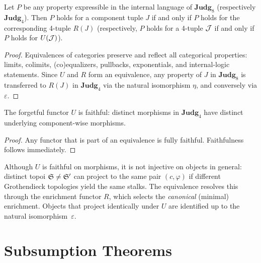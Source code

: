 \begin{corollary}
\label{cor:transfer}
Let $P$ be any property expressible in the internal language of
$\mathbf{Judg}_8$ (respectively $\mathbf{Judg}_4$).  Then $P$ holds
for a component tuple $J$ if and only if $P$ holds for the corresponding
4-tuple $R(J)$ (respectively, $P$ holds for a 4-tuple $\mathcal{J}$ if and
only if $P$ holds for $U(\mathcal{J})$).
\end{corollary}

\begin{proof}
Equivalences of categories preserve and reflect all categorical
properties: limits, colimits, (co)equalizers, pullbacks, exponentials,
and internal-logic statements.  Since $U$ and $R$ form an equivalence,
any property of $J$ in $\mathbf{Judg}_8$ is transferred to $R(J)$ in
$\mathbf{Judg}_4$ via the natural isomorphism $\eta$, and conversely
via $\varepsilon$.
\end{proof}

\begin{corollary}[Faithfulness of $U$]
\label{cor:faithful}
The forgetful functor $U$ is faithful: distinct morphisms in
$\mathbf{Judg}_4$ have distinct underlying component-wise morphisms.
\end{corollary}

\begin{proof}
Any functor that is part of an equivalence is fully faithful.
Faithfulness follows immediately.
\end{proof}

\begin{remark}
\label{rem:non-inj}
Although $U$ is faithful on morphisms, it is not injective on objects
in general: distinct topoi $\mathfrak{S} \neq \mathfrak{S}'$ can project to the
same pair $(c, \varphi)$ if different Grothendieck topologies yield
the same stalks.  The equivalence resolves this through the enrichment
functor $R$, which selects the \emph{canonical} (minimal) enrichment.
Objects that project identically under $U$ are identified up to the
natural isomorphism~$\varepsilon$.
\end{remark}


\chapter{Subsumption Theorems}
\label{ch:subsumption}

